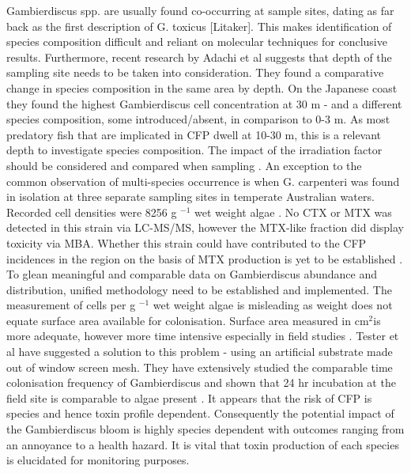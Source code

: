 \documentclass[12pt]{article}
\begin{document}
 Gambierdiscus spp. are usually found co-occurring at sample sites, dating as far back as the first description of G. toxicus [Litaker]. This makes identification of species composition difficult and reliant on molecular techniques for conclusive results. Furthermore, recent research by Adachi et al suggests that depth of the sampling site needs to be taken into consideration. They found a comparative change in species composition in the same area by depth. On the Japanese coast they found the highest Gambierdiscus cell concentration at 30 m - and a different species composition, some introduced/absent, in comparison to 0-3 m. As most predatory fish that are implicated in CFP dwell at 10-30 m, this is a relevant depth to investigate species composition. The impact of the irradiation factor should be considered and compared when sampling \cite{adachiICHA}. An exception to the common observation of multi-species occurrence is when G. carpenteri was found in isolation at three separate sampling sites in temperate Australian waters. Recorded cell densities were 8256 g $^{-1}$ wet weight algae \cite{kohli2014high}. No CTX or MTX was detected in this strain via LC-MS/MS, however the MTX-like fraction did display toxicity via MBA. Whether this strain could have contributed to the CFP incidences in the region on the basis of MTX production is yet to be established  \cite{kohli2014high}. 
To glean meaningful and comparable data on Gambierdiscus abundance and distribution, unified methodology need to be established and implemented. The measurement of cells per g $^{-1}$ wet weight algae is misleading as weight does not equate surface area available for colonisation. Surface area measured in cm$^{2}$is more adequate, however more time intensive especially in field studies \cite{parsonICHA,lobel1988assessment}. Tester et al have suggested a solution to this problem - using an artificial substrate made out of window screen mesh. They have extensively studied the comparable time colonisation frequency of Gambierdiscus and shown that 24 hr incubation at the field site is comparable to algae present \cite{tester2ICHA,tester2014sampling}. It appears that the risk of CFP is species and hence toxin profile dependent\cite{berdalet2012global}. Consequently the potential impact of the Gambierdiscus bloom is highly species dependent with outcomes ranging from an annoyance to a health hazard. It is vital that toxin production of each species is elucidated for monitoring purposes. \\%
\end{document}
